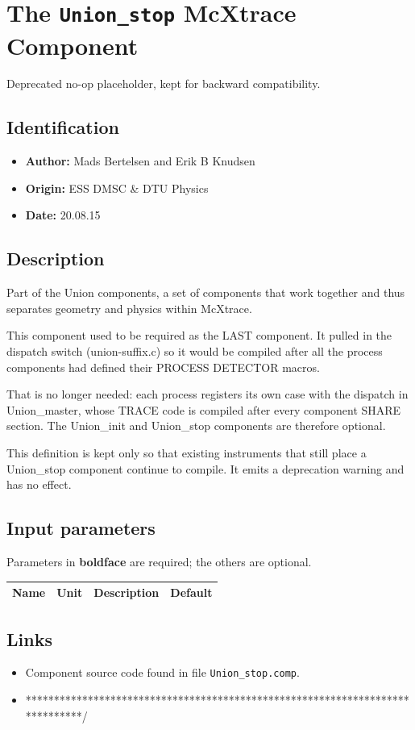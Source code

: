 \section{The \texttt{Union\_stop} McXtrace Component}
Deprecated no-op placeholder, kept for backward compatibility.

\subsection*{Identification}
\begin{itemize}
  \item \textbf{Author:} Mads Bertelsen and Erik B Knudsen
  \item \textbf{Origin:} ESS DMSC \& DTU Physics
  \item \textbf{Date:} 20.08.15
\end{itemize}

\subsection*{Description}
Part of the Union components, a set of components that work together and thus separates geometry and physics within McXtrace.

This component used to be required as the LAST component. It pulled in the dispatch switch (union-suffix.c) so it would be compiled after all the process components had defined their PROCESS DETECTOR macros.

That is no longer needed: each process registers its own case with the dispatch in Union\_master, whose TRACE code is compiled after every component SHARE section. The Union\_init and Union\_stop components are therefore optional.

This definition is kept only so that existing instruments that still place a Union\_stop component continue to compile. It emits a deprecation warning and has no effect.

\subsection*{Input parameters}
Parameters in \textbf{boldface} are required; the others are optional.

\begin{longtable}{p{}p{}p{}p{}}
\toprule
\textbf{Name} & \textbf{Unit} & \textbf{Description} & \textbf{Default} \\
\midrule
\endhead
\bottomrule
\end{longtable}

\subsection*{Links}
\begin{itemize}
  \item Component source code found in file \texttt{Union\_stop.comp}.
  \item ******************************************************************************/
\end{itemize}
